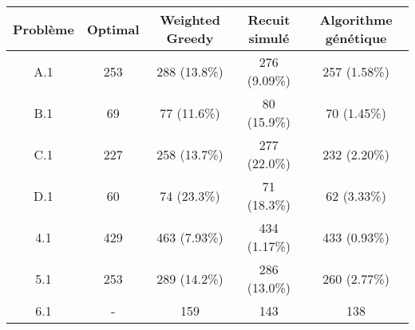 \begin{tabular}{*{5}{c}}
	\toprule
	Problème & Optimal & Weighted Greedy & Recuit simulé  & Algorithme génétique \\
	\midrule
	A.1      & 253     & 288 (13.8\%)    & 276 (9.09\%)    & 257 (1.58\%) \\
	\midrule
	B.1      & 69      & 77 (11.6\%)     & 80  (15.9\%)   & 70 (1.45\%) \\
	\midrule
	C.1      & 227     & 258 (13.7\%)    & 277 (22.0\%)   & 232 (2.20\%) \\
	\midrule
	D.1      & 60      & 74 (23.3\%)     & 71 (18.3\%)    & 62 (3.33\%) \\
	\midrule
	4.1      & 429     & 463 (7.93\%)    & 434 (1.17\%)   & 433 (0.93\%) \\
	\midrule
	5.1      & 253     & 289 (14.2\%)    & 286 (13.0\%)   & 260 (2.77\%) \\
	\midrule
	6.1      & -       & 159             & 143            & 138 \\
	\bottomrule
\end{tabular}

